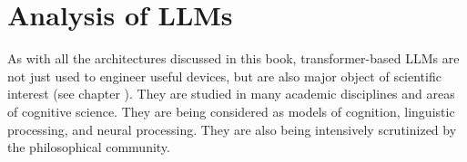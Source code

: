 
\section{Analysis of LLMs}\label{llm_analsis}

As with all the architectures discussed in this book, transformer-based LLMs are not just used to engineer useful devices, but are also major object of scientific interest (see chapter ). They are studied in many academic disciplines and areas of cognitive science. They are being considered as models of cognition, linguistic processing, and neural processing. They are also being intensively scrutinized by the philosophical community.


